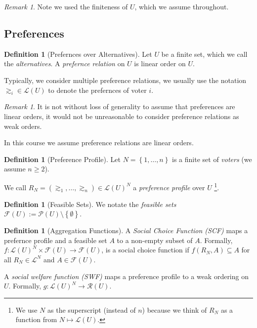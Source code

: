 \documentclass{book}
\theoremstyle{plain}
\theoremstyle{definition}
\newtheorem{definition}[theorem]{Definition}
\theoremstyle{remark}
\newtheorem{remark}[theorem]{Remark}
\newcommand{\set}[1]{\left\{#1\right\}}
\begin{document}
\begin{remark}
    Note we used the finiteness of $U$, 
    which we assume throughout.
\end{remark}

\subsection{Preferences}

\begin{definition}[Prefernces over Alternatives]
    Let $U$ be a finite set, which we call the \emph{alternatives}.
    A \emph{prefernce relation} on $U$ is linear order on $U$.

    Typically, we consider multiple preference relations, 
    we usually use the notation 
    $\gtrsim_i \in \mathcal{L}(U)$ to denote the prefernces of 
    voter $i$. 
\end{definition}

\begin{remark}
    It is not without loss of generality 
    to assume that preferences are linear orders,
    it would not be unreasonable 
    to consider preference relations as weak orders.

    In this course we assume preference relations are linear orders.
\end{remark}

\begin{definition}[Preference Profile]
    Let $N = \set{1, \dots, n}$ is a finite set of \emph{voters}
    (we assume $n \geq 2$).

    We call $R_N = (\gtrsim_1, \dots, \gtrsim_n) \in \mathcal{L}(U)^N$ a \emph{preference profile} over $U$
    \footnote{We use $N$ as the superscript (instead of $n$) because we think of $R_N$ as a function from $N \mapsto \mathcal{L}(U)$.}.
\end{definition}

\begin{definition}[Feasible Sets]
    We notate the \emph{feasible sets} $\mathcal{F}(U) := \mathcal{P}(U)\setminus \set{\emptyset}$.
\end{definition}

\begin{definition}[Aggregation Functions]
    A \emph{Social Choice Function (SCF)} maps a 
    prefernce profile and a feasible set $A$ to a
    non-empty subset of $A$. Formally, $f : \mathcal{L}(U)^N \times \mathcal{F}(U) \to \mathcal{F}(U)$, 
    is a social choice function if $f(R_N, A) \subseteq A$ for all $R_N \in \mathcal{L}^N$ and $A \in \mathcal{F}(U)$.    

    A \emph{social welfare function (SWF)} maps a preference profile to a weak ordering on $U$.
    Formally, $g : \mathcal{L}(U)^N \to \mathcal{R}(U)$.
\end{definition}
\end{document}
